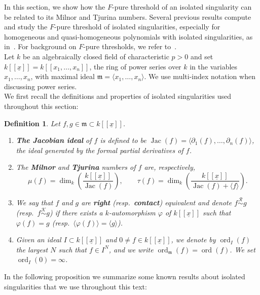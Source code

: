 \documentclass{article}
\newtheorem{definition}[theorem]{Definition}
\DeclareMathOperator{\ord}{ord}
\DeclareMathOperator{\Jac}{Jac}
\newcommand{\kx}{k[[\underline{x}]]}
\newcommand{\equivr}{\overset{\mathcal{R}}{\sim}}
\newcommand{\equivk}{\overset{\mathcal{K}}{\sim}}
\numberwithin{theorem}{section}
\begin{document}
In this section, we show how the $F$-pure threshold of an isolated singularity can be related to its Milnor and Tjurina numbers. Several previous results compute and study the $F$-pure threshold of isolated singularities, especially for homogeneous and quasi-homogeneous polynomials with isolated singularities, as in~\cite{hernandez2016f,muller2018f,canton2016behavior,kadyrsizova2022lower}. For background on $F$-pure thresholds, we refer to~\cite{schwede2024singularities}.\\

Let $k$ be an algebraically closed field of characteristic $p>0$ and set $k[[\underline{x}]]=k[[x_1,\dots,x_n]]$, the ring of power series over $k$ in the variables $x_1,\dots,x_n$, with maximal ideal $\mathfrak{m}=\langle x_1,\dots,x_n\rangle$. We use multi-index notation when discussing power series.\\

We first recall the definitions and properties of isolated singularities used throughout this section:

\begin{definition}\label{def:iso_sing}
Let $f,g\in\mathfrak{m}\subset\kx$.
\begin{enumerate}
    \item \textbf{The Jacobian ideal} of $f$ is defined to be $\Jac(f)=\langle\partial_1(f),\dots,\partial_n(f)\rangle$, the ideal generated by the formal partial derivatives of $f$.
    \item The \textbf{Milnor} and \textbf{Tjurina} numbers of $f$ are, respectively,
    \[
        \mu(f)=\dim_k\!\left(\frac{\kx}{\Jac(f)}\right),\qquad
        \tau(f)=\dim_k\!\left(\frac{\kx}{\Jac(f)+\langle f\rangle}\right).
    \]
    \item We say that $f$ and $g$ are \textbf{right} (resp.\ \textbf{contact}) equivalent and denote $f\equivr g$ (resp.\ $f\equivk g$) if there exists a $k$-automorphism $\varphi$ of $\kx$ such that $\varphi(f)=g$ (resp.\ $\langle\varphi(f)\rangle=\langle g\rangle$).
    \item Given an ideal $I\subset\kx$ and $0\neq f\in\kx$, we denote by $\ord_I(f)$ the largest $N$ such that $f\in I^N$, and we write $\ord_{\mathfrak{m}}(f)=\ord(f)$. We set $\ord_I(0)=\infty$.
\end{enumerate}
\end{definition}

In the following proposition we summarize some known results about isolated singularities that we use throughout this text:
\end{document}
